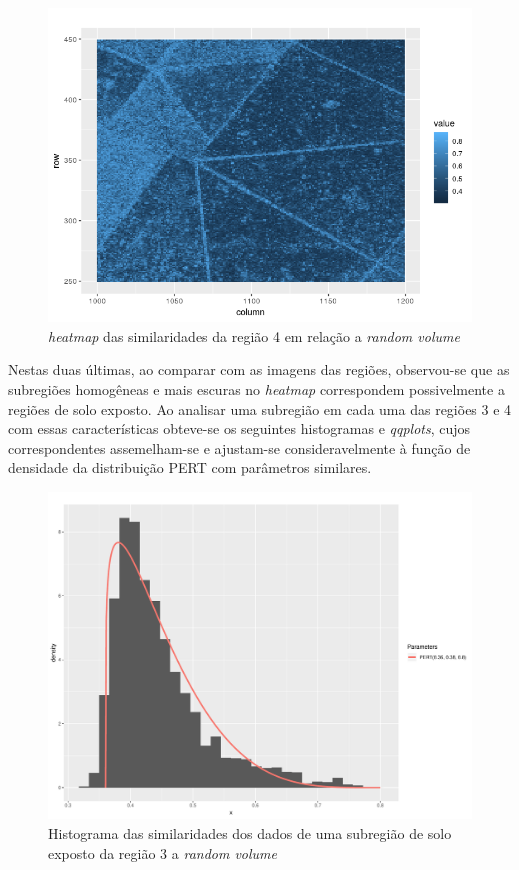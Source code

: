 \documentclass[12pt]{article}
\begin{document}
\begin{figure}[!h]

  \centering
  \includegraphics[width=0.8\linewidth]{../../Images/Report_19_02_27/heatmap_rv_region4.png}
  \caption{\textit{heatmap} das similaridades da região 4 em relação a \textit{random volume}}
  \label{fig:heat_rv4}

\end{figure}

\newpage

Nestas duas últimas, ao comparar com as imagens das regiões, observou-se que as subregiões homogêneas e mais escuras no \textit{heatmap} correspondem possivelmente a regiões de solo exposto. Ao analisar uma subregião em cada uma das regiões 3 e 4 com essas características obteve-se os seguintes histogramas e \textit{qqplots}, cujos correspondentes assemelham-se e ajustam-se consideravelmente à função de densidade da distribuição PERT com parâmetros similares.

\begin{figure}[!h]

  \centering
  \includegraphics[width=0.8\linewidth]{../../Figures/Report_19_02_27/hist_rv_subregion3.pdf}
  \caption{Histograma das similaridades dos dados de uma subregião de solo exposto da região 3 a \textit{random volume}}
  \label{fig:hist_sub_rv3}

\end{figure}
\end{document}
